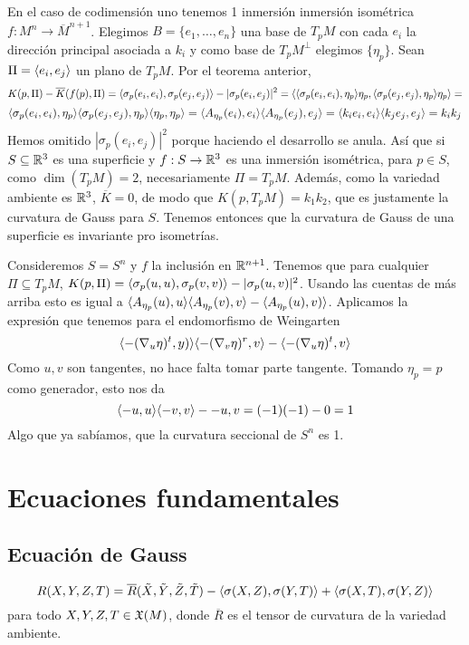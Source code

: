 \documentclass[GSR.tex]{subfiles}
\begin{document}
\begin{ej}
En el caso de codimensión uno tenemos 1 inmersión inmersión isométrica $f:M^n\to\overline{M}^{n+1}$. Elegimos $B=\{e_1,\dots, e_n\}$ una base de $T_pM$ con cada $e_i$ la dirección principal asociada a $k_i$ y como base de $T_pM^\perp$ elegimos $\{\eta_p\}$. Sean $\Pi=\langle{e_i,e_j}\rangle$ un plano de $T_pM$. Por el teorema anterior,
\[
K(p,\Pi)-\overline{K}(f(p),\Pi)=\langle{\sigma_p(e_i,e_i),\sigma_p(e_j,e_j)}\rangle-|\sigma_p(e_i,e_j)|^2=\langle{\langle{\sigma_p(e_i,e_i),\eta_p}\rangle\eta_p,\langle{\sigma_p(e_j,e_j),\eta_p}\rangle\eta_p}\rangle=
\] 
\[
\langle{\sigma_p(e_i,e_i),\eta_p}\rangle\langle{\sigma_p(e_j,e_j),\eta_p}\rangle\langle{\eta_p,\eta_p}\rangle=\langle{A_{\eta_p}(e_i),e_i}\rangle\langle{A_{\eta_p}(e_j),e_j}\rangle=\langle{k_ie_i,e_i}\rangle\langle{k_je_j,e_j}\rangle=k_ik_j
\]
Hemos omitido $|\sigma_p(e_i,e_j)|^2$ porque haciendo el desarrollo se anula. Así que si $S\subseteq\mathbb{R}^3$ es una superficie y $f:S\to\mathbb{R}^3$ es una inmersión isométrica, para $p\in S$, como $\dim(T_pM)=2$, necesariamente $\Pi=T_pM$. Además, como la variedad ambiente es $\mathbb{R}^3$, $\overline{K}=0$, de modo que $K(p,T_pM)=k_1k_2$, que es justamente la curvatura de Gauss para $S$. Tenemos entonces que la curvatura de Gauss de una superficie es invariante pro isometrías. 

Consideremos $S=S^n$ y $f$ la inclusión en $\mathbb{R}^{n+1}$. Tenemos que para cualquier $\Pi\subseteq T_pM$,  $K(p,\Pi)=\langle{\sigma_p(u,u),\sigma_p(v,v)}\rangle-|\sigma_p(u,v)|^2$. Usando las cuentas de más arriba esto es igual a $\langle{A_{\eta_p}(u),u}\rangle\langle{A_{\eta_p}(v),v}\rangle-\langle{A_{\eta_p}(u),v)}\rangle$. Aplicamos la expresión que tenemos para el endomorfismo de Weingarten
\[
\langle{-(\nabla_u\eta)^t,y)}\rangle\langle{-(\nabla_v\eta)^r,v}\rangle-\langle{-(\nabla_u\eta)^t,v}\rangle
\]
Como $u,v$ son tangentes, no hace falta tomar parte tangente. Tomando $\eta_p=p$ como generador, esto nos da
\[
\langle{-u,u}\rangle\langle{-v,v}\rangle-{-u,v}=(-1)(-1)-0=1
\]
Algo que ya sabíamos, que la curvatura seccional de $S^n$ es 1. 
\end{ej}


\section{Ecuaciones fundamentales}

\subsection{Ecuación de Gauss}

\[
R(X,Y,Z,T)=\overline{R}(\tilde{X},\tilde{Y},\tilde{Z},\tilde{T})-\langle{\sigma(X,Z),\sigma(Y,T)}\rangle+\langle{\sigma(X,T),\sigma(Y,Z)}\rangle
\]
para todo $X,Y,Z,T\in{\mathfrak{X}}(M)$, donde $\overline{R}$ es el tensor de curvatura de la variedad ambiente.
\end{document}
